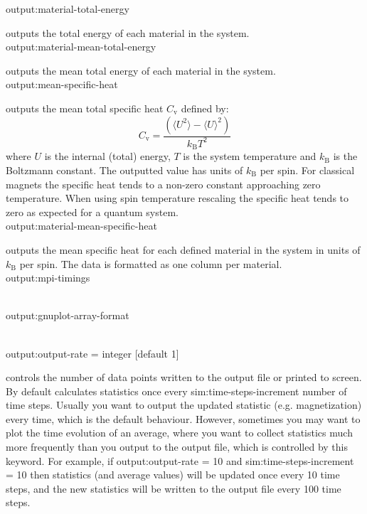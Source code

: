 {\zicf output:material-total-energy} outputs
the total energy of each material in the system.\\

{\zicf output:material-mean-total-energy} outputs
the mean total energy of each material in the system.\\

{\zicf output:mean-specific-heat} outputs the mean
total specific heat $C_{\mathrm{v}}$ defined by:
\begin{equation*}
C_{\mathrm{v}} = \frac{\left(\langle U^2 \rangle - \langle U \rangle^2 \right)}{k_{\mathrm{B}} T^2}
\end{equation*}
where $U$ is the internal (total) energy, $T$ is the system temperature and $k_{\mathrm{B}}$ is the Boltzmann
constant. The outputted value has units of $k_{\mathrm{B}}$ per spin. For classical magnets the specific heat
tends to a non-zero constant approaching zero temperature. When using spin temperature rescaling the specific
heat tends to zero as expected for a quantum system.\\

{\zicf output:material-mean-specific-heat} outputs the
mean specific heat for each defined material in the system in units of $k_{\mathrm{B}}$ per spin. The data is formatted as
one column per material.\\

{\zicf output:mpi-timings}\\

{\zicf output:gnuplot-array-format}\\

{\zicf output:output-rate = integer [default 1]}
controls the number of data points written to the output file or printed to screen. By default \vampire
calculates statistics once every sim:time-steps-increment number of time steps. Usually you want to
output the updated statistic (e.g. magnetization) every time, which is the default behaviour. However,
sometimes you may want to plot the time evolution of an average, where you want to collect statistics
much more frequently than you output to the output file, which is controlled by this keyword. For
example, if output:output-rate = 10 and sim:time-steps-increment = 10 then statistics (and average
values) will be updated once every 10 time steps, and the new statistics will be written to the output
file every 100 time steps.\\

